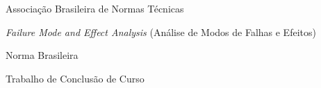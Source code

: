 \begin{siglas}
  \item[ABNT] Associação Brasileira de Normas Técnicas
  \item[FMEA] \textit{Failure Mode and Effect Analysis} (Análise de Modos de Falhas e Efeitos)
  \item[NBR] Norma Brasileira
  \item[TCC] Trabalho de Conclusão de Curso
\end{siglas}
